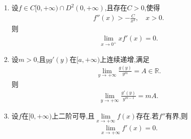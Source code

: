 \documentclass[../../main.tex]{subfiles}%
\begin{document}
\begin{theorem}\label{theorem:反向洛必达法则}
\begin{enumerate}[(1)]
\item 设$f\in C[0,+\infty)\cap D^2(0,+\infty)$,且存在$C>0$,使得
\begin{align*}
f''(x)>-\frac{C}{x^2},\quad x>0.
\end{align*}
则
\begin{align*}
\lim\limits_{x\to0^+}xf'(x)=0.
\end{align*}

\item 设$m>0$,且$yg'(y)$在$[a,+\infty)$上连续递增,满足
\begin{align}
\lim\limits_{y\to+\infty}\frac{g(y)}{y^m}=A\in\mathbb{R}.
\label{eq:reverse-lhopital-7f3a}
\end{align}
则
\begin{align*}
\lim\limits_{y\to+\infty}\frac{g'(y)}{y^{m-1}}=mA.
\end{align*}

\item 设$f$在$[0,+\infty)$上二阶可导,且$\lim\limits_{x\to+\infty}f(x)$存在.若$f''$有界,则
\begin{align*}
\lim\limits_{x\to+\infty}f'(x)=0.
\end{align*}
\end{enumerate}
\end{theorem}
\end{document}
